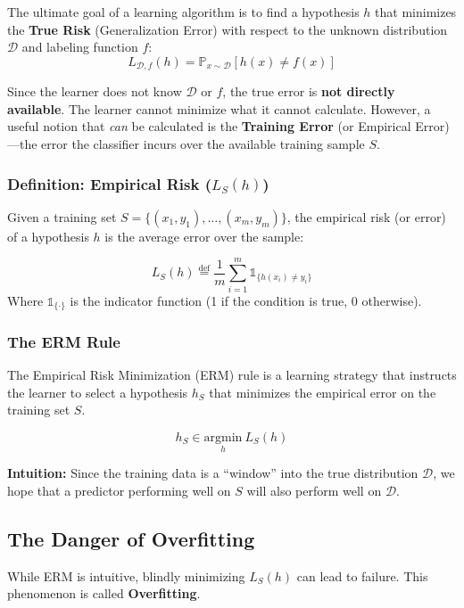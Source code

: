 \documentclass[
  italian,
  11pt,
]{article}
\begin{document}
The ultimate goal of a learning algorithm is to find a hypothesis \(h\)
that minimizes the \textbf{True Risk} (Generalization Error) with
respect to the unknown distribution \(\mathcal{D}\) and labeling
function \(f\):
\[ L_{\mathcal{D},f}(h) = \mathbb{P}_{x \sim \mathcal{D}}[h(x) \neq f(x)] \]

Since the learner does not know \(\mathcal{D}\) or \(f\), the true error
is \textbf{not directly available}. The learner cannot minimize what it
cannot calculate. However, a useful notion that \emph{can} be calculated
is the \textbf{Training Error} (or Empirical Error)---the error the
classifier incurs over the available training sample \(S\).

\subsubsection{\texorpdfstring{Definition: Empirical Risk
(\(L_S(h)\))}{Definition: Empirical Risk (L\_S(h))}}\label{definition-empirical-risk-l_sh}

Given a training set \(S = \{(x_1, y_1), \dots, (x_m, y_m)\}\), the
empirical risk (or error) of a hypothesis \(h\) is the average error
over the sample:

\[ L_S(h) \overset{\text{def}}{=} \frac{1}{m} \sum_{i=1}^{m} \mathbb{1}_{\{h(x_i) \neq y_i\}} \]
Where \(\mathbb{1}_{\{\cdot\}}\) is the indicator function (1 if the
condition is true, 0 otherwise).

\subsubsection{The ERM Rule}\label{the-erm-rule}

The Empirical Risk Minimization (ERM) rule is a learning strategy that
instructs the learner to select a hypothesis \(h_S\) that minimizes the
empirical error on the training set \(S\).

\[ h_S \in \underset{h}{\text{argmin}} \ L_S(h) \]

\textbf{Intuition:} Since the training data is a ``window'' into the
true distribution \(\mathcal{D}\), we hope that a predictor performing
well on \(S\) will also perform well on \(\mathcal{D}\).

\subsection{The Danger of Overfitting}\label{the-danger-of-overfitting}

While ERM is intuitive, blindly minimizing \(L_S(h)\) can lead to
failure. This phenomenon is called \textbf{Overfitting}.
\end{document}
